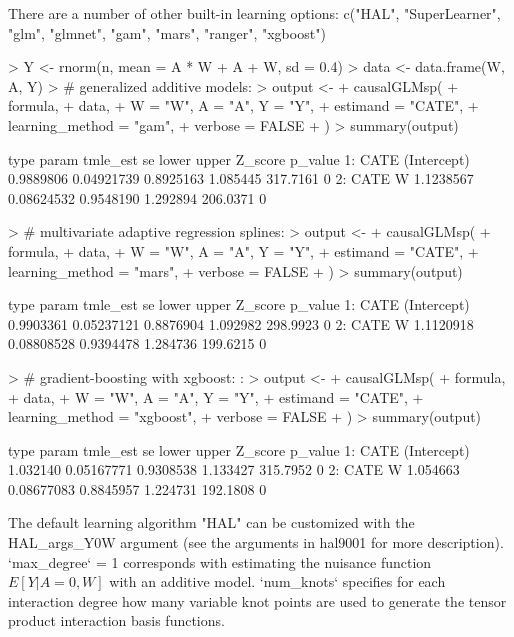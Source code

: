 \documentclass{article}
\begin{document}
There are a number of other built-in learning options: c("HAL", "SuperLearner", "glm", "glmnet", "gam", "mars", "ranger", "xgboost")

\begin{Schunk}
\begin{Sinput}
> Y <- rnorm(n, mean = A * W + A + W, sd = 0.4)
> data <- data.frame(W, A, Y)
> # generalized additive models:
> output <-
+   causalGLMsp(
+     formula,
+     data,
+     W = "W", A = "A", Y = "Y",
+     estimand = "CATE",
+     learning_method = "gam",
+     verbose = FALSE
+   )
> summary(output)
\end{Sinput}
\begin{Soutput}
   type       param  tmle_est         se     lower    upper  Z_score p_value
1: CATE (Intercept) 0.9889806 0.04921739 0.8925163 1.085445 317.7161       0
2: CATE           W 1.1238567 0.08624532 0.9548190 1.292894 206.0371       0
\end{Soutput}
\begin{Sinput}
> # multivariate adaptive regression splines:
> output <-
+   causalGLMsp(
+     formula,
+     data,
+     W = "W", A = "A", Y = "Y",
+     estimand = "CATE",
+     learning_method = "mars",
+     verbose = FALSE
+   )
> summary(output)
\end{Sinput}
\begin{Soutput}
   type       param  tmle_est         se     lower    upper  Z_score p_value
1: CATE (Intercept) 0.9903361 0.05237121 0.8876904 1.092982 298.9923       0
2: CATE           W 1.1120918 0.08808528 0.9394478 1.284736 199.6215       0
\end{Soutput}
\begin{Sinput}
> # gradient-boosting with xgboost: :
> output <-
+   causalGLMsp(
+     formula,
+     data,
+     W = "W", A = "A", Y = "Y",
+     estimand = "CATE",
+     learning_method = "xgboost",
+     verbose = FALSE
+   )
> summary(output) 
\end{Sinput}
\begin{Soutput}
   type       param tmle_est         se     lower    upper  Z_score p_value
1: CATE (Intercept) 1.032140 0.05167771 0.9308538 1.133427 315.7952       0
2: CATE           W 1.054663 0.08677083 0.8845957 1.224731 192.1808       0
\end{Soutput}
\end{Schunk}


The default learning algorithm "HAL" can be customized with the HAL\_args\_Y0W argument (see the arguments in hal9001 for more description). `max\_degree` = 1 corresponds with estimating the nuisance function $E[Y|A=0,W]$ with an additive model. `num\_knots` specifies for each interaction degree how many variable knot points are used to generate the tensor product interaction basis functions. 
\end{document}
